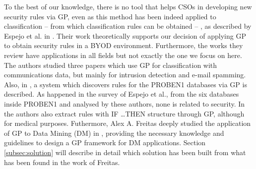 \documentclass[a4paper,10pt,twocolumn,preprint,3p]{elsarticle}
\begin{document}
To the best of our knowledge, there is no tool that helps CSOs in
developing new security rules via GP, %
 even as this method has been
indeed applied to classification -- from which classification rules
can be obtained -- , as described by Espejo et al. in
\cite{espejo2010survey}. Their work theoretically supports our
decision of applying GP to obtain security rules in a BYOD
environment. Furthermore, the works they review have applications in
all fields but not exactly the one we focus on here. The authors
studied three papers which use GP for classification with
communications data, but mainly for intrusion detection and e-mail
spamming. Also, in \cite{DeFalco2002257}, a system which discovers
rules for the PROBEN1 databases via GP is described. As happened in
the survey of Espejo et al., from the six databases inside PROBEN1 and
analysed by these authors, none is related to security. In
\cite{Tsakonas2004195} the authors also extract rules with \textsc{IF
  \ldots THEN} structure through GP, although for medical purposes. Futhermore, Alex A. Freitas deeply studied the application of GP to Data Mining (DM) in \cite{freitas2002data}, providing the necessary knowledge and guidelines to design a GP framework for DM applications. Section \ref{subsec:solution} will describe in detail which solution has been built from what has been found in the work of Freitas.
\end{document}
